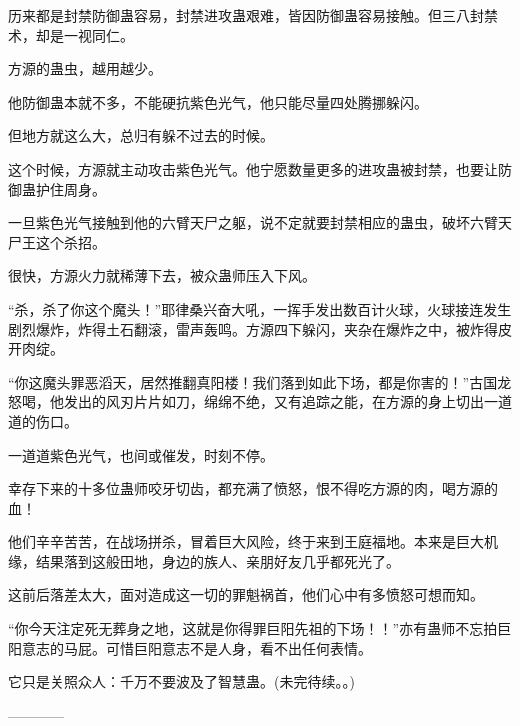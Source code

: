 \begin{this_body}
历来都是封禁防御蛊容易，封禁进攻蛊艰难，皆因防御蛊容易接触。但三八封禁术，却是一视同仁。

方源的蛊虫，越用越少。

他防御蛊本就不多，不能硬抗紫色光气，他只能尽量四处腾挪躲闪。

但地方就这么大，总归有躲不过去的时候。

这个时候，方源就主动攻击紫色光气。他宁愿数量更多的进攻蛊被封禁，也要让防御蛊护住周身。

一旦紫色光气接触到他的六臂天尸之躯，说不定就要封禁相应的蛊虫，破坏六臂天尸王这个杀招。

很快，方源火力就稀薄下去，被众蛊师压入下风。

“杀，杀了你这个魔头！”耶律桑兴奋大吼，一挥手发出数百计火球，火球接连发生剧烈爆炸，炸得土石翻滚，雷声轰鸣。方源四下躲闪，夹杂在爆炸之中，被炸得皮开肉绽。

“你这魔头罪恶滔天，居然推翻真阳楼！我们落到如此下场，都是你害的！”古国龙怒喝，他发出的风刃片片如刀，绵绵不绝，又有追踪之能，在方源的身上切出一道道的伤口。

一道道紫色光气，也间或催发，时刻不停。

幸存下来的十多位蛊师咬牙切齿，都充满了愤怒，恨不得吃方源的肉，喝方源的血！

他们辛辛苦苦，在战场拼杀，冒着巨大风险，终于来到王庭福地。本来是巨大机缘，结果落到这般田地，身边的族人、亲朋好友几乎都死光了。

这前后落差太大，面对造成这一切的罪魁祸首，他们心中有多愤怒可想而知。

“你今天注定死无葬身之地，这就是你得罪巨阳先祖的下场！！”亦有蛊师不忘拍巨阳意志的马屁。可惜巨阳意志不是人身，看不出任何表情。

它只是关照众人：千万不要波及了智慧蛊。(未完待续。。)

------------

\end{this_body}

